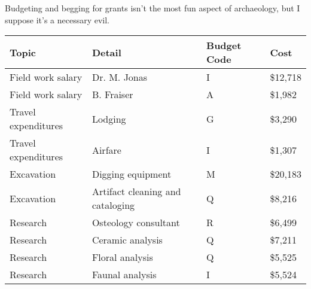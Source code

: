 {\LARGE\normalfont\wedn
Budgeting and begging for grants isn't the most fun aspect of
archaeology, but I suppose it's a necessary evil.

\normalsize
\begin{center}
\begin{tabular}{llll}
\textbf{Topic}      & \textbf{Detail}                  & \textbf{Budget Code} & \textbf{Cost}     \\\hline
Field work salary   & Dr. M. Jonas                     & I           & \$12,718 \\
Field work salary   & B. Fraiser                       & A           & \$1,982  \\
Travel expenditures & Lodging                          & G           & \$3,290  \\
Travel expenditures & Airfare                          & I           & \$1,307  \\
Excavation          & Digging equipment                & M           & \$20,183 \\
Excavation          & Artifact cleaning and cataloging & Q           & \$8,216  \\
Research            & Osteology consultant             & R           & \$6,499  \\
Research            & Ceramic analysis                 & Q           & \$7,211  \\
Research            & Floral analysis                  & Q           & \$5,525  \\
Research            & Faunal analysis                  & I           & \$5,524 
\end{tabular}
\end{center}
}
